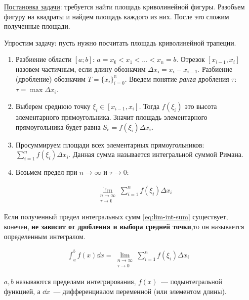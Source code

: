 
\underline{Постановка задачи}: требуется найти площадь криволинейной фигуры.
Разобьем фигуру на квадраты и найдем площадь каждого из них. После это сложим
полученные площади.



Упростим задачу: пусть нужно посчитать площадь криволинейной трапеции.

\vspace{10pt}

\begin{multicols}{2}


\begin{enumerate}
  \item Разбиение области \([a;b]\): \(a = x_{0} < x_{1} < \dotsc < x_{n} = b\).
  Отрезок \([x_{i - 1}, x_{i}]\) назовем частичным, если длину обозначим 
  \(\Delta x_{i} = x_{i} - x_{i - 1}\).
  Разбиение (дробление) обозначим \(T = \{ x_{i} \}_{i = 0}^{n}\). Введем
  понятие \textit{ранга} дробления \(\tau\): \(\tau = \max \Delta x_{i}\).

  \item Выберем среднюю точку \(\xi_{i} \in [x_{i - 1}, x_{i}]\). Тогда
  \(f(\xi_{i})\) это высота элементарного прямоугольника. Значит площадь
  элементарного прямоугольника будет равна \(S_{e} = f(\xi_{i}) \Delta x_{i}\).

  \item Просуммируем площади всех элементарных прямоугольников:
  \(\sum_{i = 1}^{n} f(\xi_{i}) \Delta x_{i}\). Данная сумма называется
  интегральной суммой Римана.

  \item Возьмем предел при \(n \to \infty\) и \(\tau \to 0\):
  
  \begin{align*}\label{eq:lim-int-sum}\tag{1}
    \lim_{\substack{n \to \infty \\ \tau \to 0}}
      \sum_{i = 1}^{n} f(\xi_{i}) \Delta x_{i}
  \end{align*}
\end{enumerate}
\end{multicols}

\begin{definition}
  Если полученный предел интегральных сумм \eqref{eq:lim-int-sum} существует,
  конечен, \textbf{не зависит от дробления и выбора средней точки},то он
  называется определенным интегралом.

  \begin{align*}
    \int_{a}^{b} f(x) \dd x = \lim_{\substack{n \to \infty \\ \tau \to 0}}
      \sum_{i = 1}^{n} f(\xi_{i}) \Delta x_{i}
  \end{align*}

  \(a, b\) называются пределами интегрирования, \(f(x)\)~--- подынтегральной
  функцией, а \(\dd x\)~--- дифференциалом переменной (или элементом длины).
\end{definition}

